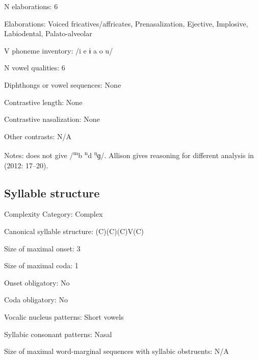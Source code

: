 {\begin{appendixdesc}
\item[N elaborations:] 6

\item[Elaborations:] Voiced fricatives/affricates, Prenasalization, Ejective, Implosive, Labiodental, Palato-alveolar

\item[V phoneme inventory:] /i e ɨ a o u/

\item[N vowel qualities:] 6

\item[Diphthongs or vowel sequences:] None

\item[Contrastive length:] None

\item[Contrastive nasalization:] None

\item[Other contrasts:] N/A

\item[Notes:] \citet{Mahamat2005} does not give /\textsuperscript{m}b \textsuperscript{n}d \textsuperscript{ŋ}ɡ/. Allison gives reasoning for different analysis in (2012: 17--20).
\end{appendixdesc}
\subsection*{Syllable structure}
\begin{appendixdesc}

\item[Complexity Category:] Complex

\item[Canonical syllable structure:] (C)(C)(C)V(C) \citep[23--24]{Allison2012}

\item[Size of maximal onset:] 3

\item[Size of maximal coda:] 1

\item[Onset obligatory:] No

\item[Coda obligatory:] No

\item[Vocalic nucleus patterns:] Short vowels

\item[Syllabic consonant patterns:] Nasal

\item[Size of maximal word-marginal sequences with syllabic obstruents:] N/A


\end{appendixdesc}}
